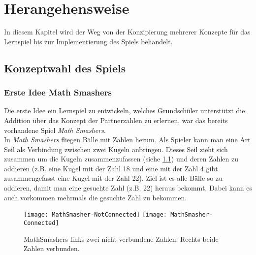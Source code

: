 %
\chapter{Herangehensweise}
In diesem Kapitel wird der Weg von der Konzipierung mehrerer Konzepte für das Lernspiel bis zur Implementierung des Spiels behandelt.
\section{Konzeptwahl des Spiels}
\subsection{Erste Idee Math Smashers}
Die erste Idee ein Lernspiel zu entwickeln, welches Grundschüler unterstützt die Addition über das Konzept der Partnerzahlen zu erlernen, war das bereits vorhandene Spiel \textit{Math Smashers}.\\
In \textit{Math Smashers} fliegen Bälle mit Zahlen herum. Als Spieler kann man eine Art Seil als Verbindung zwischen zwei Kugeln anbringen. Dieses Seil zieht sich zusammen um die Kugeln zusammenzufassen (siehe \ref{fig:mathsmashers}) und deren Zahlen zu addieren (z.B. eine Kugel mit der Zahl 18 und eine mit der Zahl 4 gibt zusammengefasst eine Kugel mit der Zahl 22). Ziel ist es alle Bälle so zu addieren, damit man eine gesuchte Zahl (z.B. 22) heraus bekommt. Dabei kann es auch vorkommen mehrmals die gesuchte Zahl zu bekommen.
\begin{figure}[htb]
	\centering
	\texttt{[image: MathSmasher-NotConnected]}
	\texttt{[image: MathSmasher-Connected]}
	\caption{MathSmashers links zwei nicht verbundene Zahlen. Rechts beide Zahlen verbunden.\label{fig:mathsmashers}}
\end{figure}
